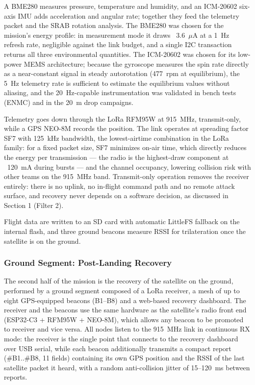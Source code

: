 A BME280 measures pressure, temperature and humidity, and an ICM-20602
six-axis IMU adds acceleration and angular rate; together they feed
the telemetry packet and the SRAB rotation analysis. The BME280 was
chosen for the mission's energy profile: in measurement mode it draws
~3.6~$\mu$A at a 1~Hz refresh rate, negligible against the link
budget, and a single I2C transaction returns all three environmental
quantities. The ICM-20602 was chosen for its low-power MEMS
architecture; because the gyroscope measures the spin rate directly
as a near-constant signal in steady autorotation (477~rpm at
equilibrium), the 5~Hz telemetry rate is sufficient to estimate the
equilibrium values without aliasing, and the 20~Hz-capable
instrumentation was validated in bench tests (ENMC) and in the 20~m
drop campaigns.

Telemetry goes down through the LoRa RFM95W at 915~MHz, transmit-only,
while a GPS NEO-8M records the position. The link operates at
spreading factor SF7 with 125~kHz bandwidth, the lowest-airtime
combination in the LoRa family: for a fixed packet size, SF7 minimizes
on-air time, which directly reduces the energy per transmission ---
the radio is the highest-draw component at ~120~mA during bursts ---
and the channel occupancy, lowering collision risk with other teams on
the 915~MHz band. Transmit-only operation removes the receiver
entirely: there is no uplink, no in-flight command path and no remote
attack surface, and recovery never depends on a software decision, as
discussed in Section 1 (Filter 2).

Flight data are written to an SD card with
automatic LittleFS fallback on the internal flash, and three ground
beacons measure RSSI for trilateration once the satellite is on the
ground.

\subsubsection{Ground Segment: Post-Landing Recovery}

The second half of the mission is the recovery of the satellite on
the ground, performed by a ground segment composed of a LoRa receiver,
a mesh of up to eight GPS-equipped beacons (B1--B8) and a web-based
recovery dashboard. The receiver and the beacons use the same hardware
as the satellite's radio front end (ESP32-C3 + RFM95W + NEO-8M), which
allows any beacon to be promoted to receiver and vice versa. All nodes
listen to the 915~MHz link in continuous RX mode: the receiver is the
single point that connects to the recovery dashboard over USB serial,
while each beacon additionally transmits a compact report
(\#B1..\#B8, 11 fields) containing its own GPS position and the RSSI
of the last satellite packet it heard, with a random anti-collision
jitter of 15--120~ms between reports.

